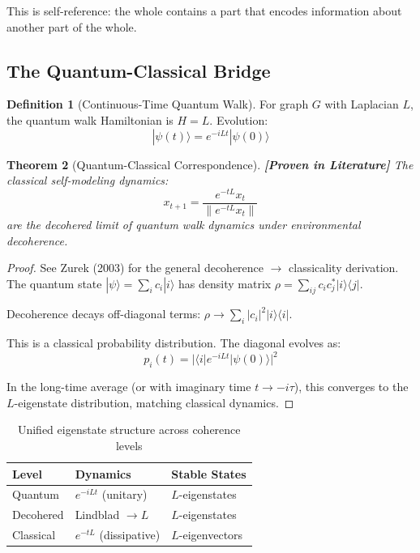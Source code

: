 \documentclass[11pt]{article}
\newtheorem{theorem}{Theorem}[section]
\theoremstyle{definition}
\newtheorem{definition}[theorem]{Definition}
\theoremstyle{remark}
\begin{document}
This is self-reference: the whole contains a part that encodes information about another part of the whole.

\subsection{The Quantum-Classical Bridge}

\begin{definition}[Continuous-Time Quantum Walk]
For graph $G$ with Laplacian $L$, the quantum walk Hamiltonian is $H = L$. Evolution:
\[
|\psi(t)\rangle = e^{-iLt}|\psi(0)\rangle
\]
\end{definition}

\begin{theorem}[Quantum-Classical Correspondence]\label{thm:qc_correspondence}
\textbf{[Proven in Literature]} The classical self-modeling dynamics:
\[
x_{t+1} = \frac{e^{-tL}x_t}{\|e^{-tL}x_t\|}
\]
are the decohered limit of quantum walk dynamics under environmental decoherence.
\end{theorem}

\begin{proof}
See Zurek (2003) for the general decoherence $\to$ classicality derivation. The quantum state $|\psi\rangle = \sum_i c_i |i\rangle$ has density matrix $\rho = \sum_{ij} c_i c_j^* |i\rangle\langle j|$.

Decoherence decays off-diagonal terms: $\rho \to \sum_i |c_i|^2 |i\rangle\langle i|$.

This is a classical probability distribution. The diagonal evolves as:
\[
p_i(t) = |\langle i|e^{-iLt}|\psi(0)\rangle|^2
\]

In the long-time average (or with imaginary time $t \to -i\tau$), this converges to the $L$-eigenstate distribution, matching classical dynamics.
\end{proof}

\begin{table}[h]
\centering
\begin{tabular}{lll}
\toprule
\textbf{Level} & \textbf{Dynamics} & \textbf{Stable States} \\
\midrule
Quantum & $e^{-iLt}$ (unitary) & $L$-eigenstates \\
Decohered & Lindblad $\to L$ & $L$-eigenstates \\
Classical & $e^{-tL}$ (dissipative) & $L$-eigenvectors \\
\bottomrule
\end{tabular}
\caption{Unified eigenstate structure across coherence levels}
\end{table}
\end{document}
